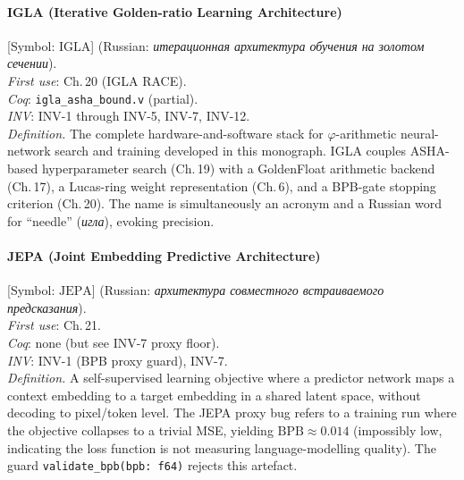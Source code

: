 \paragraph*{\textmd{\textbf{IGLA (Iterative Golden-ratio Learning Architecture)}}}
\label{entry:igla}
[Symbol: $\mathrm{IGLA}$] (Russian: \textit{итерационная архитектура обучения на золотом сечении}).\\
\textit{First use}: Ch.\,20 (IGLA RACE).\\
\textit{Coq}: \texttt{igla\_asha\_bound.v} (partial).\\
\textit{INV}: INV-1 through INV-5, INV-7, INV-12.\\
\textit{Definition.}
The complete hardware-and-software stack for $\varphi$-arithmetic
neural-network search and training developed in this monograph.
IGLA couples ASHA-based hyperparameter search (Ch.\,19) with a
GoldenFloat arithmetic backend (Ch.\,17), a Lucas-ring weight
representation (Ch.\,6), and a BPB-gate stopping criterion (Ch.\,20).
The name is simultaneously an acronym and a Russian word for
``needle'' (\textit{игла}), evoking precision.

\paragraph*{\textmd{\textbf{JEPA (Joint Embedding Predictive Architecture)}}}
\label{entry:jepa}
[Symbol: $\mathrm{JEPA}$] (Russian: \textit{архитектура совместного встраиваемого предсказания}).\\
\textit{First use}: Ch.\,21.\\
\textit{Coq}: none (but see INV-7 proxy floor).\\
\textit{INV}: INV-1 (BPB proxy guard), INV-7.\\
\textit{Definition.}
A self-supervised learning objective where a predictor network maps
a context embedding to a target embedding in a shared latent space,
without decoding to pixel/token level.
The JEPA proxy bug refers to a training run where the objective
collapses to a trivial MSE, yielding $\mathrm{BPB}\approx 0.014$
(impossibly low, indicating the loss function is not measuring
language-modelling quality).
The guard \texttt{validate\_bpb(bpb: f64)} rejects this artefact.

